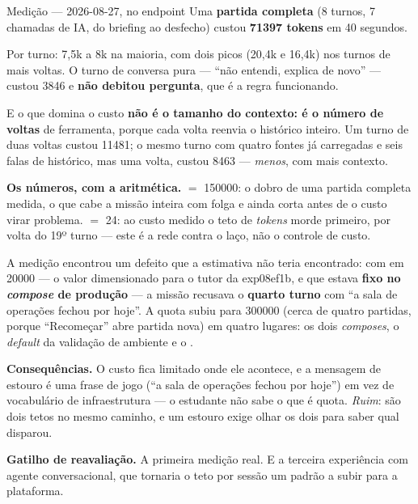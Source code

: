 \begin{especificacao}{Medição --- 2026-08-27,  no endpoint }
Uma \textbf{partida completa} (8 turnos, 7 chamadas de IA, do briefing ao
desfecho) custou \textbf{\num{71397} tokens} em 40 segundos.

Por turno: 7,5k a 8k na maioria, com dois picos (20,4k e 16,4k) nos turnos de
mais voltas. O turno de conversa pura --- \enquote{não entendi, explica de
novo} --- custou \num{3846} e \textbf{não debitou pergunta}, que é a regra
funcionando.

E o que domina o custo \textbf{não é o tamanho do contexto: é o número de
voltas} de ferramenta, porque cada volta reenvia o histórico inteiro. Um turno de
duas voltas custou \num{11481}; o mesmo turno com quatro fontes já carregadas e
seis falas de histórico, mas uma volta, custou \num{8463} --- \emph{menos}, com
mais contexto.
\end{especificacao}

\textbf{Os números, com a aritmética.}  $=$ \num{150000}:
o dobro de uma partida completa medida, o que cabe a missão inteira com folga e
ainda corta antes de o custo virar problema.  $=$ 24:
ao custo medido o teto de \emph{tokens} morde primeiro, por volta do 19º turno ---
este é a rede contra o laço, não o controle de custo.

\begin{atencao}
A medição encontrou um defeito que a estimativa não teria encontrado: com
 em \num{20000} --- o valor dimensionado
para o tutor da exp08ef1b, e que estava \textbf{fixo no \emph{compose} de
produção} --- a missão recusava o \textbf{quarto turno} com \enquote{a sala de
operações fechou por hoje}. A quota subiu para \num{300000} (cerca de quatro
partidas, porque \enquote{Recomeçar} abre partida nova) em quatro lugares: os dois
\emph{composes}, o \emph{default} da validação de ambiente e o
.
\end{atencao}

\textbf{Consequências.} O custo fica limitado onde ele acontece, e a mensagem de
estouro é uma frase de jogo (\enquote{a sala de operações fechou por hoje}) em vez
de vocabulário de infraestrutura --- o estudante não sabe o que é quota. \emph{Ruim}:
são dois tetos no mesmo caminho, e um estouro exige olhar os dois para saber qual
disparou.

\textbf{Gatilho de reavaliação.} A primeira medição real. E a terceira
experiência com agente conversacional, que tornaria o teto por sessão um padrão a
subir para a plataforma.

